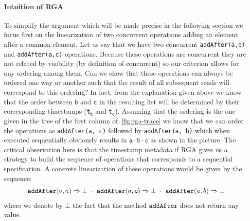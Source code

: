 \paragraph{Intuition of RGA \CRDTLinshort{}}
To simplify the argument which will be made precise in the following
section we focus first on the linearization of two concurrent
operations adding an element after a common element.
%
Let us say that we have two concurrent \lstinline|addAfter(a,b)| and
\lstinline|addAfter(a,c)| operations.
%
Because these operations are concurrent they are not related by
visibility (by definition of concurrent) so our criterion allows for
any ordering among them.
%
Can we show that these operations can always be ordered one way or
another such that the result of all subsequent reads will correspond
to this ordering?
%
In fact, from the explanation given above we know that the order
between \lstinline|b| and \lstinline|c| in the resulting list will be
determined by their corresponding timestamps
(\lstinline|t|$_{\mathtt{b}}$ and \lstinline|t|$_{\mathtt{c}}$).
%
Assuming that the ordering is the one given in the tree of the first
column of~\autoref{fig:rga-trace} we know that we can order the
operations as \lstinline|addAfter(a, c)| followed by
\lstinline|addAfter(a, b)| which when executed sequentially obviously
results in $\mathtt{a \cdot b \cdot c}$ as shown in the picture.
%
The critical observation here is that the timestamp metadata if RGA
gives us a strategy to build the sequence of operations that
corresponds to a sequential specification.
%
A concrete linearization of these operations would be given by the
sequence:
\[\alabellong[\mathtt{addAfter}]{\circ,a}{\bot}\ \cdot\
\alabellong[\mathtt{addAfter}]{a,c}{\bot}\ \cdot\
\alabellong[\mathtt{addAfter}]{a,b}{\bot}
\]
where we denote by $\bot$ the fact that the method $\mathtt{addAfter}$
does not return any value.

